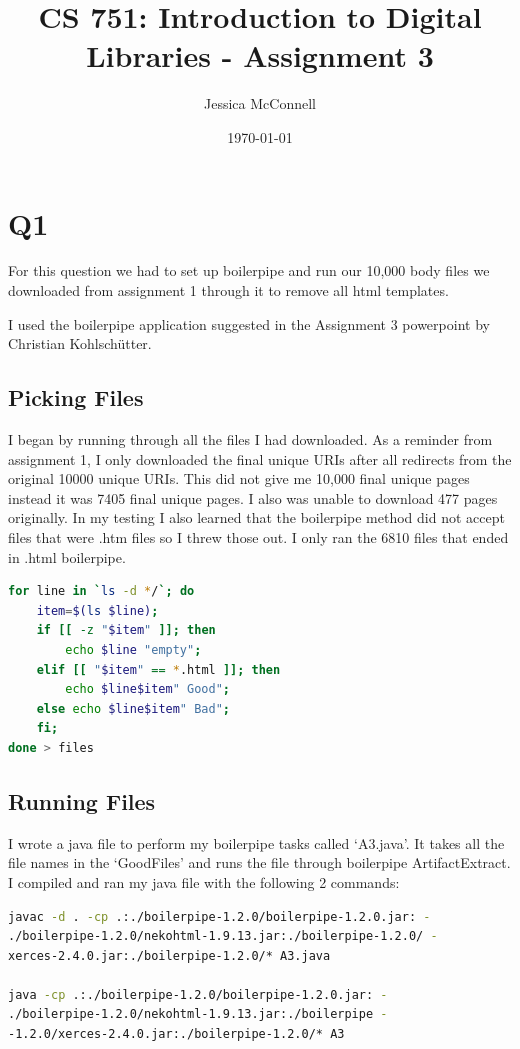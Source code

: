 \documentclass[12pt]{article}
\title{CS 751: Introduction to Digital Libraries - Assignment 3}
\author{Jessica McConnell}
\date{\today}
\begin{document}
\maketitle

\section{Q1}
For this question we had to set up boilerpipe and run our 10,000 body files we downloaded from assignment 1 through it to remove all html templates.

I used the boilerpipe application suggested in the Assignment 3 powerpoint by Christian Kohlschütter. \nocite{Kohlschütter:2011:boilerpipe}
\subsection{Picking Files}
I began by running through all the files I had downloaded. As a reminder from assignment 1, I only downloaded the final unique URIs after all redirects from the original 10000 unique URIs. This did not give me 10,000 final unique pages instead it was 7405 final unique pages. I also was unable to download 477 pages originally. In my testing I also learned that the boilerpipe method did not accept files that were .htm files so I threw those out.  I only ran the 6810 files that ended in .html boilerpipe.

\begin{lstlisting}[language=bash]
for line in `ls -d */`; do 
    item=$(ls $line); 
    if [[ -z "$item" ]]; then 
        echo $line "empty"; 
    elif [[ "$item" == *.html ]]; then 
        echo $line$item" Good"; 
    else echo $line$item" Bad"; 
    fi; 
done > files
\end{lstlisting}

\subsection{Running Files}
I wrote a java file to perform my boilerpipe tasks called `A3.java'.  It takes all the file names in the `GoodFiles' and runs the file through boilerpipe ArtifactExtract.  I compiled and ran my java file with the following 2 commands:

\begin{lstlisting}[language=bash]
javac -d . -cp .:./boilerpipe-1.2.0/boilerpipe-1.2.0.jar: - 
./boilerpipe-1.2.0/nekohtml-1.9.13.jar:./boilerpipe-1.2.0/ - 
xerces-2.4.0.jar:./boilerpipe-1.2.0/* A3.java

java -cp .:./boilerpipe-1.2.0/boilerpipe-1.2.0.jar: - 
./boilerpipe-1.2.0/nekohtml-1.9.13.jar:./boilerpipe - 
-1.2.0/xerces-2.4.0.jar:./boilerpipe-1.2.0/* A3
\end{lstlisting}
\end{document}
